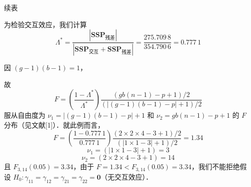 
\begin{mvtable}
\noindent\hfill{续表}\par
{}
\end{mvtable}

为检验交互效应，我们计算
\[
\Lambda^*=\frac{|\mathbf{SSP}_{\text{残差}}|}{|\mathbf{SSP}_{\text{交互}}+\mathbf{SSP}_{\text{残差}}|}=\frac{275.709\,8}{354.790\,6}=0.777\,1
\]

因 $(g-1)(b-1)=1$，

故
\[
F=\left(\frac{1-\Lambda^*}{\Lambda^*}\right)\frac{(gb(n-1)-p+1)/2}{(|(g-1)(b-1)-p|+1)/2}
\]
服从自由度为 $\nu_1=|(g-1)(b-1)-p|+1$ 和 $\nu_2=gb(n-1)-p+1$ 的 $F$ 分布（见文献[1]）．就此例而言，
\[
F=\left(\frac{1-0.777\,1}{0.777\,1}\right)\frac{(2\times2\times4-3+1)/2}{(|1\times1-3|+1)/2}=1.34
\]
\[
\nu_1=(|1\times1-3|+1)=3
\]
\[
\nu_2=(2\times2\times4-3+1)=14
\]
且 $F_{3,14}(0.05)=3.34$，由于 $F=1.34<F_{3,14}(0.05)=3.34$，我们不能拒绝假设 $H_0:\gamma_{11}=\gamma_{12}=\gamma_{21}=\gamma_{22}=\mathbf{0}$（无交互效应）．

